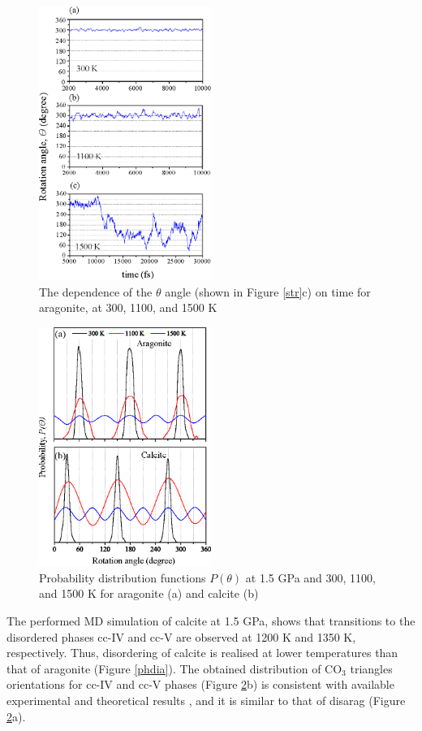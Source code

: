 \documentclass[journal=jacsat,manuscript=article]{achemso}
\begin{document}
\begin{figure}[H]
\includegraphics[width=0.5\textwidth]{rot15} \centering
\caption{The dependence of the $\theta$ angle (shown in Figure \ref{str}c) on time for aragonite, at 300, 1100, and 1500 K} \label{rot15}
\end{figure}

\begin{figure}[H]
\includegraphics[width=0.5\textwidth]{distr15} \centering
\caption{Probability distribution functions $P(\theta)$ at 1.5 GPa and 300, 1100, and 1500 K for aragonite (a) and calcite (b)} \label{distr15}
\end{figure}

The performed MD simulation of calcite at 1.5 GPa, shows that transitions to the disordered phases cc-IV and cc-V are observed at 1200 K and 1350 K, respectively.
Thus, disordering  of calcite is realised at lower temperatures than that of aragonite (Figure \ref{phdia}). 
The obtained distribution of CO$_3$ triangles orientations for cc-IV and cc-V phases (Figure \ref{distr15}b) is consistent with available experimental \cite{ishizawa2013} and theoretical results \cite{kawano2009}, and it is similar to that of disarag (Figure \ref{distr15}a).
\end{document}
